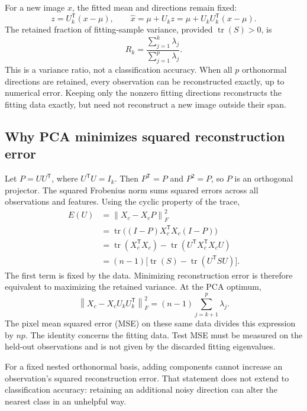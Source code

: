 \documentclass[11pt,a4paper,english]{article}
\numberwithin{equation}{section}
\DeclareMathOperator{\tr}{tr}
\newcommand{\norm}[1]{\left\lVert#1\right\rVert}
\newcommand{\T}{^{\mathsf T}}
\begin{document}
For a new image $x$, the fitted mean and directions remain fixed:
\begin{equation}
z=U_k\T(x-\mu),\qquad
\hat x=\mu+U_kz=\mu+U_kU_k\T(x-\mu).
\label{eq:reconstruct}
\end{equation}
The retained fraction of fitting-sample variance, provided $\tr(S)>0$, is
\begin{equation}
R_k=\frac{\sum_{j=1}^k\lambda_j}{\sum_{j=1}^p\lambda_j}.
\label{eq:ratio}
\end{equation}
This is a variance ratio, not a classification accuracy. When all $p$ orthonormal directions are retained, every observation can be reconstructed exactly, up to numerical error. Keeping only the nonzero fitting directions reconstructs the fitting data exactly, but need not reconstruct a new image outside their span.

\subsection{Why PCA minimizes squared reconstruction error}
Let $P=UU\T$, where $U\T U=I_k$. Then $P\T=P$ and $P^2=P$, so $P$ is an orthogonal projector. The squared Frobenius norm sums squared errors across all observations and features. Using the cyclic property of the trace,
\begin{align}
E(U)&=\norm{X_c-X_cP}_F^2\nonumber\\
&=\tr\bigl((I-P)X_c\T X_c(I-P)\bigr)\nonumber\\
&=\tr(X_c\T X_c)-\tr(U\T X_c\T X_cU)\nonumber\\
&=(n-1)\bigl[\tr(S)-\tr(U\T SU)\bigr].
\label{eq:errorproof}
\end{align}
The first term is fixed by the data. Minimizing reconstruction error is therefore equivalent to maximizing the retained variance. At the PCA optimum,
\begin{equation}
\boxed{\norm{X_c-X_cU_kU_k\T}_F^2=(n-1)\sum_{j=k+1}^p\lambda_j.}
\label{eq:discarded}
\end{equation}
The pixel mean squared error (MSE) on these same data divides this expression by $np$. The identity concerns the fitting data. Test MSE must be measured on the held-out observations and is not given by the discarded fitting eigenvalues.

For a fixed nested orthonormal basis, adding components cannot increase an observation's squared reconstruction error. That statement does not extend to classification accuracy: retaining an additional noisy direction can alter the nearest class in an unhelpful way.
\end{document}
